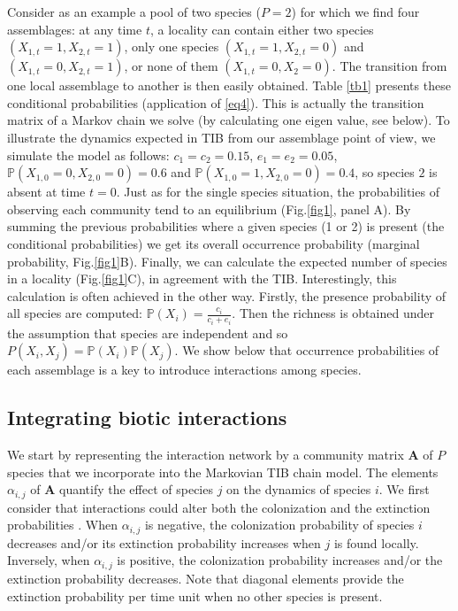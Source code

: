 Consider as an example a pool of two species ($P=2$) for which we find four assemblages: at any time $t$, a locality can contain either two species $(X_{1,t}=1, X_{2,t}=1)$, only one species $(X_{1,t}=1, X_{2,t}=0)$ and $(X_{1,t}=0, X_{2,t}=1)$, or none of them $(X_{1,t}=0, X_2=0)$. The transition from one local assemblage to another is then easily obtained. Table \ref{tb1} presents these conditional probabilities (application of \eqref{eq4}). This is actually the transition matrix of a Markov chain we solve (by calculating one eigen value, see below). To illustrate the dynamics expected in TIB from our assemblage point of view, we simulate the model as follows: $c_1=c_2=0.15$, $e_1=e_2=0.05$, $\mathbb{P}(X_{1,0}=0, X_{2,0}=0)=0.6$ and $\mathbb{P}(X_{1,0}=1, X_{2,0}=0)=0.4$, so species $2$ is absent at time $t=0$. Just as for the single species situation, the probabilities of observing each community tend to an equilibrium (Fig.\ref{fig1}, panel A). By summing the previous probabilities where a given species (1 or 2) is present (the conditional probabilities) we get its overall occurrence probability (marginal probability, Fig.\ref{fig1}B). Finally, we can calculate the expected number of species in a locality (Fig.\ref{fig1}C), in agreement with the TIB. Interestingly, this calculation is often achieved in the other way. Firstly, the presence probability of all species are computed: $\mathbb{P}(X_i)=\frac{c_i}{c_i+e_i}$. Then the richness is obtained under the assumption that species are independent and so $P(X_i,X_j)=\mathbb{P}(X_i)\mathbb{P}(X_j)$. We show below that occurrence probabilities of each assemblage is a key to introduce interactions among species.


\subsection{Integrating biotic interactions}

We start by representing the interaction network by a community matrix $\mathbf{A}$ of $P$ species that we incorporate into the Markovian TIB chain model. The elements $\alpha_{i,j}$ of $\mathbf{A}$ quantify the effect of species $j$ on the dynamics of species $i$. We first consider that interactions could alter both the colonization and the extinction probabilities \citep{Gravel2011Trophic}. When $\alpha_{i,j}$ is negative, the colonization probability of species $i$ decreases and/or its extinction probability increases when $j$ is found locally. Inversely, when $\alpha_{i,j}$ is positive, the colonization probability increases and/or the extinction probability decreases. Note that diagonal elements provide the extinction probability per time unit when no other species is present.


